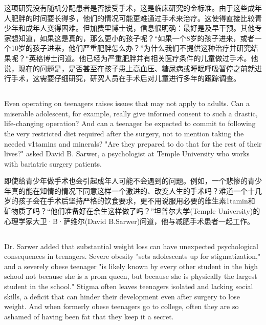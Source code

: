 \documentclass[]{article}
\begin{document}
这项研究没有随机分配患者是否接受手术，这是临床研究的金标准。由于这些成年人肥胖的时间要长得多，他们的情况可能更难通过手术来治疗。这使得直接比较青少年和成年人变得困难。但加费里博士说，信息很明确：最好是及早干预。其他专家想知道，如果这是真的，那么更小的孩子呢？“如果一个8岁的孩子进来，或者一个10岁的孩子进来，他们严重肥胖怎么办？”为什么我们不提供这种治疗并研究结果呢？“英格博士问道。他已经为严重肥胖并有相关医疗条件的儿童做过手术。他说，现在的问题是，是否甚至在孩子患上高血压、糖尿病或睡眠呼吸暂停之前就进行手术，这需要仔细研究，研究人员在手术后对儿童进行多年的跟踪调查。

\subsection{}
\begin{spacing}{2.0}
	{\Large Even operating on teenagers raises issues that may not apply to adults. Can a miserable adolescent, for example, really give informed consent to such a drastic, life-changing operation? And can a teenager be expected to commit to following the very restricted diet required after the surgery, not
	to mention taking the needed v1tamins and minerals? "Are they prepared to do that for the rest of their lives?" asked David B. Sarwer, a psychologist at Temple University who works with bariatric surgery patients.}\newline
\end{spacing}

即使给青少年做手术也会引起成年人可能不会遇到的问题。例如，一个悲惨的青少年真的能在知情的情况下同意这样一个激进的、改变人生的手术吗？难道一个十几岁的孩子会在手术后坚持严格的饮食要求，更不用说服用必要的维生素1tamin和矿物质了吗？“他们准备好在余生这样做了吗？”坦普尔大学(Temple University)的心理学家大卫·B·萨维尔(David B.Sarwer)问道，他与减肥手术患者一起工作。

\subsection{}
\begin{spacing}{2.0}
	{\Large Dr. Sarwer added that substantial weight loss can have unexpected psychological consequences in teenagers. Severe obesity "sets adolescents up for stigmatization," and a severely obese teenager "is likely known by every other student in the high school not because she is a prom queen, but because she is physically the largest student in the school." Stigma often leaves teenagers isolated and lacking social skills, a deficit that can hinder their development even after surgery to lose weight.	And when formerly obese teenagers go to college, often they are so ashamed of having been fat that they keep it a secret.}\newline
\end{spacing}
\end{document}
